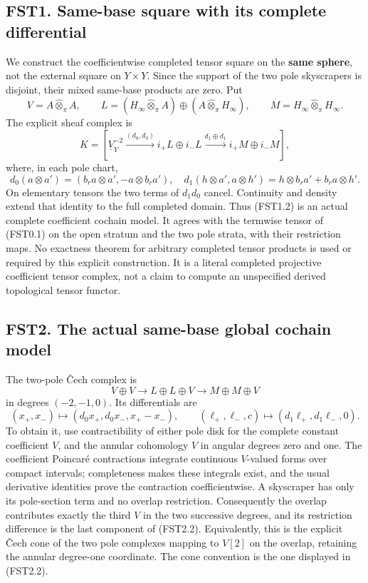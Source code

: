 \subsection{FST1. Same-base square with its complete
differential}\label{fst1.-same-base-square-with-its-complete-differential}

We construct the coefficientwise completed tensor square on the
\textbf{same sphere}, not the external square on \(Y\times Y\). Since
the support of the two pole skyscrapers is disjoint, their mixed
same-base products are zero. Put \[
V=A\widehat\otimes_\pi A,\qquad
L=(H_\infty\widehat\otimes_\pi A)\oplus(A\widehat\otimes_\pi H_\infty),
\qquad M=H_\infty\widehat\otimes_\pi H_\infty.
\tag{FST1.1}
\] The explicit sheaf complex is \[
K=[\underline V_Y^{-2}\xrightarrow{(d_0,d_0)}i_+L\oplus i_-L
\xrightarrow{d_1\oplus d_1}i_+M\oplus i_-M],
\tag{FST1.2}
\] where, in each pole chart, \[
d_0(a\otimes a')=(b_ra\otimes a',-a\otimes b_ra'),
\quad d_1(h\otimes a',a\otimes h')=h\otimes b_ra'+b_ra\otimes h'.
\tag{FST1.3}
\] On elementary tensors the two terms of \(d_1d_0\) cancel. Continuity
and density extend that identity to the full completed domain. Thus
(FST1.2) is an actual complete coefficient cochain model. It agrees with
the termwise tensor of (FST0.1) on the open stratum and the two pole
strata, with their restriction maps. No exactness theorem for arbitrary
completed tensor products is used or required by this explicit
construction. It is a literal completed projective coefficient tensor
complex, not a claim to compute an unspecified derived topological
tensor functor.

\subsection{FST2. The actual same-base global cochain
model}\label{fst2.-the-actual-same-base-global-cochain-model}

The two-pole Čech complex is \[
V\oplus V\longrightarrow L\oplus L\oplus V
\longrightarrow M\oplus M\oplus V
\tag{FST2.1}
\] in degrees \((-2,-1,0)\). Its differentials are \[
(x_+,x_-)\longmapsto(d_0x_+,d_0x_-,x_+-x_-),
\qquad(\ell_+,\ell_-,c)\longmapsto(d_1\ell_+,d_1\ell_-,0).
\tag{FST2.2}
\] To obtain it, use contractibility of either pole disk for the
complete constant coefficient \(V\), and the annular cohomology \(V\) in
angular degrees zero and one. The coefficient Poincaré contractions
integrate continuous \(V\)-valued forms over compact intervals;
completeness makes these integrals exist, and the usual derivative
identities prove the contraction coefficientwise. A skyscraper has only
its pole-section term and no overlap restriction. Consequently the
overlap contributes exactly the third \(V\) in the two successive
degrees, and its restriction difference is the last component of
(FST2.2). Equivalently, this is the explicit Čech cone of the two pole
complexes mapping to \(V[2]\) on the overlap, retaining the annular
degree-one coordinate. The cone convention is the one displayed in
(FST2.2).

